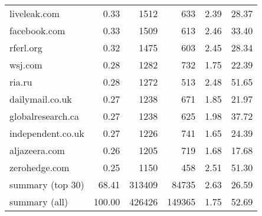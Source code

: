 \begin{tabular}{lrrrrr}
liveleak.com        &    0.33 &    1512 &     633 &         2.39 &        28.37 \\
facebook.com        &    0.33 &    1509 &     613 &         2.46 &        33.40 \\
rferl.org           &    0.32 &    1475 &     603 &         2.45 &        28.34 \\
wsj.com             &    0.28 &    1282 &     732 &         1.75 &        22.39 \\
ria.ru              &    0.28 &    1272 &     513 &         2.48 &        51.65 \\
dailymail.co.uk     &    0.27 &    1238 &     671 &         1.85 &        21.97 \\
globalresearch.ca   &    0.27 &    1238 &     625 &         1.98 &        37.72 \\
independent.co.uk   &    0.27 &    1226 &     741 &         1.65 &        24.39 \\
aljazeera.com       &    0.26 &    1205 &     719 &         1.68 &        17.68 \\
zerohedge.com       &    0.25 &    1150 &     458 &         2.51 &        51.30 \\
summary (top 30)    &   68.41 &  313409 &   84735 &         2.63 &        26.59 \\
summary (all)       &  100.00 &  426426 &  149365 &         1.75 &        52.69 \\
\bottomrule
\end{tabular}

